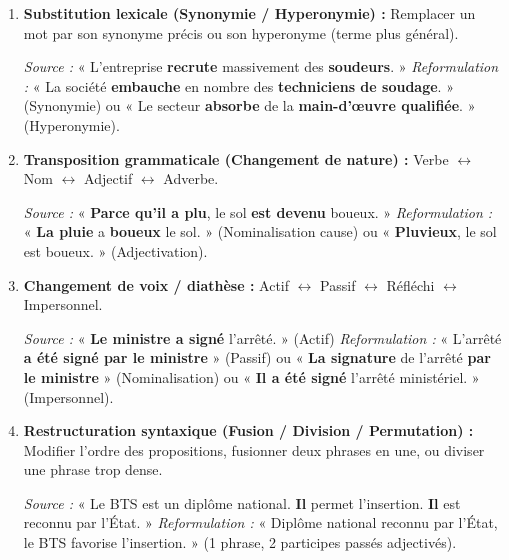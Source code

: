 \documentclass[11pt]{article}
\begin{document}
\begin{propriete}
\begin{enumerate}
    \item \textbf{Substitution lexicale (Synonymie / Hyperonymie) :} Remplacer un mot par son synonyme précis ou son hyperonyme (terme plus général).
    \begin{exemplebox}[Substitution]
    \emph{Source :} « L'entreprise \textbf{recrute} massivement des \textbf{soudeurs}. »
    \emph{Reformulation :} « La société \textbf{embauche} en nombre des \textbf{techniciens de soudage}. » (Synonymie) ou « Le secteur \textbf{absorbe} de la \textbf{main-d'œuvre qualifiée}. » (Hyperonymie).
    \end{exemplebox}
    \item \textbf{Transposition grammaticale (Changement de nature) :} Verbe $\leftrightarrow$ Nom $\leftrightarrow$ Adjectif $\leftrightarrow$ Adverbe.
    \begin{exemplebox}[Transposition]
    \emph{Source :} « \textbf{Parce qu'il a plu}, le sol \textbf{est devenu} boueux. »
    \emph{Reformulation :} « \textbf{La pluie} a \textbf{boueux} le sol. » (Nominalisation cause) ou « \textbf{Pluvieux}, le sol est boueux. » (Adjectivation).
    \end{exemplebox}
    \item \textbf{Changement de voix / diathèse :} Actif $\leftrightarrow$ Passif $\leftrightarrow$ Réfléchi $\leftrightarrow$ Impersonnel.
    \begin{exemplebox}[Diathèse]
    \emph{Source :} « \textbf{Le ministre a signé} l'arrêté. » (Actif)
    \emph{Reformulation :} « L'arrêté \textbf{a été signé par le ministre} » (Passif) ou « \textbf{La signature} de l'arrêté \textbf{par le ministre} » (Nominalisation) ou « \textbf{Il a été signé} l'arrêté ministériel. » (Impersonnel).
    \end{exemplebox}
    \item \textbf{Restructuration syntaxique (Fusion / Division / Permutation) :} Modifier l'ordre des propositions, fusionner deux phrases en une, ou diviser une phrase trop dense.
    \begin{exemplebox}[Fusion]
    \emph{Source :} « Le BTS est un diplôme national. \textbf{Il} permet l'insertion. \textbf{Il} est reconnu par l'État. »
    \emph{Reformulation :} « Diplôme national reconnu par l'État, le BTS favorise l'insertion. » (1 phrase, 2 participes passés adjectivés).
    \end{exemplebox}
\end{enumerate}
\end{propriete}
\end{document}
